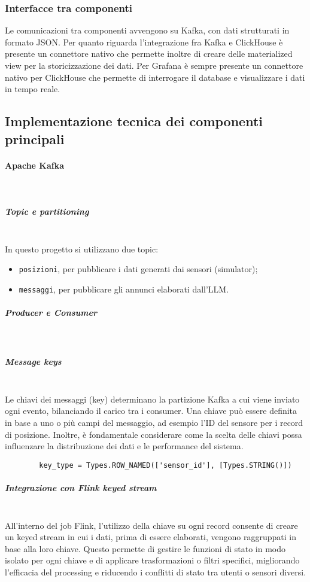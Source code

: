 \documentclass[10pt]{article}
\newcommand{\myparagraph}[1]{\paragraph{#1}\mbox{}\\}
\newcommand{\mysubparagraph}[1]{\subparagraph{#1}\mbox{}\\}
\begin{document}
\subsubsection{Interfacce tra componenti}
Le comunicazioni tra componenti avvengono su Kafka, con dati strutturati in formato JSON. Per quanto riguarda l'integrazione fra Kafka e ClickHouse è presente un connettore nativo che permette inoltre di creare delle materialized view per la storicizzazione dei dati. Per Grafana è sempre presente un connettore nativo per ClickHouse che permette di interrogare il database e visualizzare i dati in tempo reale.

    \subsection{Implementazione tecnica dei componenti principali}
        \myparagraph{Apache Kafka}
            \mysubparagraph{Topic e partitioning}
        In questo progetto si utilizzano due topic: 
        \begin{itemize}
        \item \texttt{posizioni}, per pubblicare i dati generati dai sensori (simulator);
        \item \texttt{messaggi}, per pubblicare gli annunci elaborati dall’LLM.
        \end{itemize}

        \mysubparagraph{Producer e Consumer}

        \mysubparagraph{Message keys}
        Le chiavi dei messaggi (key) determinano la partizione Kafka a cui viene inviato ogni evento, bilanciando il carico tra i consumer. Una chiave può essere definita in base a uno o più campi del messaggio, ad esempio l'ID del sensore per i record di posizione. Inoltre, è fondamentale considerare come la scelta delle chiavi possa influenzare la distribuzione dei dati e le performance del sistema.
        \begin{lstlisting}
        key_type = Types.ROW_NAMED(['sensor_id'], [Types.STRING()])
        \end{lstlisting}

        \mysubparagraph{Integrazione con Flink keyed stream}
        All’interno del job Flink, l'utilizzo della chiave su ogni record consente di creare un keyed stream
        in cui i dati, prima di essere elaborati, vengono raggruppati in base alla loro chiave. Questo permette
        di gestire le funzioni di stato in modo isolato per ogni chiave e di applicare trasformazioni o filtri
        specifici, migliorando l’efficacia del processing e riducendo i conflitti di stato tra utenti o sensori
        diversi.
\end{document}
